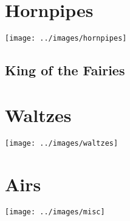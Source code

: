 \documentclass[12pt]{report}
\newcommand*{\cleartoleftpage}{%
	\clearpage
	\ifodd\value{page}\hbox{}\newpage\fi
}
\newcommand*{\cleartorightpage}{%
	\clearpage
	\ifodd\value{page}\else\hbox{}\newpage\fi
}
\begin{document}
\cleartorightpage
\chapter*{Hornpipes}
\begin{center}
\texttt{[image: ../images/hornpipes]}
\end{center}

	\cleartoleftpage
	\section*{King of the Fairies}
	

\cleartorightpage
\chapter*{Waltzes}
\begin{center}
\texttt{[image: ../images/waltzes]}
\end{center}

%	

%	


	\cleartoleftpage
	

\cleartorightpage
\chapter*{Airs}
\begin{center}
\texttt{[image: ../images/misc]}
\end{center}


	\cleartoleftpage
	

\end{document}
